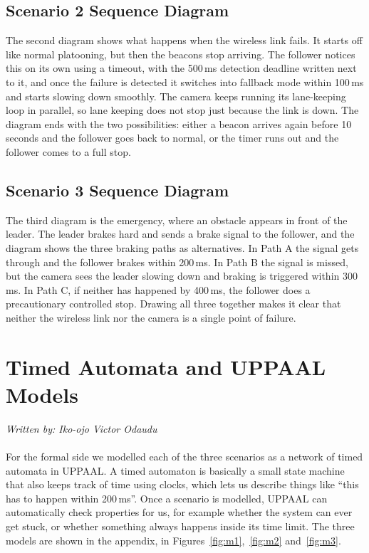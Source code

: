 \documentclass[english]{lni}
\begin{document}
\subsection{Scenario 2 Sequence Diagram}
The second diagram shows what happens when the wireless link fails. It starts off like normal platooning, but then the beacons stop arriving. The follower notices this on its own using a timeout, with the 500\,ms detection deadline written next to it, and once the failure is detected it switches into fallback mode within 100\,ms and starts slowing down smoothly. The camera keeps running its lane-keeping loop in parallel, so lane keeping does not stop just because the link is down. The diagram ends with the two possibilities: either a beacon arrives again before 10 seconds and the follower goes back to normal, or the timer runs out and the follower comes to a full stop.

\subsection{Scenario 3 Sequence Diagram}
The third diagram is the emergency, where an obstacle appears in front of the leader. The leader brakes hard and sends a brake signal to the follower, and the diagram shows the three braking paths as alternatives. In Path A the signal gets through and the follower brakes within 200\,ms. In Path B the signal is missed, but the camera sees the leader slowing down and braking is triggered within 300\,ms. In Path C, if neither has happened by 400\,ms, the follower does a precautionary controlled stop. Drawing all three together makes it clear that neither the wireless link nor the camera is a single point of failure.

\section{Timed Automata and UPPAAL Models}
\textit{Written by: Iko-ojo Victor Odaudu}
\\~\\
For the formal side we modelled each of the three scenarios as a network of timed automata in UPPAAL. A timed automaton is basically a small state machine that also keeps track of time using clocks, which lets us describe things like ``this has to happen within 200\,ms''. Once a scenario is modelled, UPPAAL can automatically check properties for us, for example whether the system can ever get stuck, or whether something always happens inside its time limit. The three models are shown in the appendix, in Figures~\ref{fig:m1},~\ref{fig:m2} and~\ref{fig:m3}.
\end{document}
